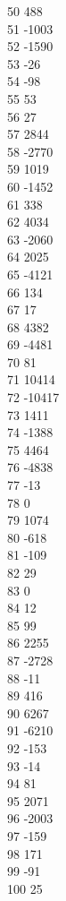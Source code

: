 { 50	488 \\
 51	-1003 \\
 52	-1590 \\
 53	-26 \\
 54	-98 \\
 55	53 \\
 56	27 \\
 57	2844 \\
 58	-2770 \\
 59	1019 \\
 60	-1452 \\
 61	338 \\
 62	4034 \\
 63	-2060 \\
 64	2025 \\
 65	-4121 \\
 66	134 \\
 67	17 \\
 68	4382 \\
 69	-4481 \\
 70	81 \\
 71	10414 \\
 72	-10417 \\
 73	1411 \\
 74	-1388 \\
 75	4464 \\
 76	-4838 \\
 77	-13 \\
 78	0 \\
 79	1074 \\
 80	-618 \\
 81	-109 \\
 82	29 \\
 83	0 \\
 84	12 \\
 85	99 \\
 86	2255 \\
 87	-2728 \\
 88	-11 \\
 89	416 \\
 90	6267 \\
 91	-6210 \\
 92	-153 \\
 93	-14 \\
 94	81 \\
 95	2071 \\
 96	-2003 \\
 97	-159 \\
 98	171 \\
 99	-91 \\
 100	25 \\
}
